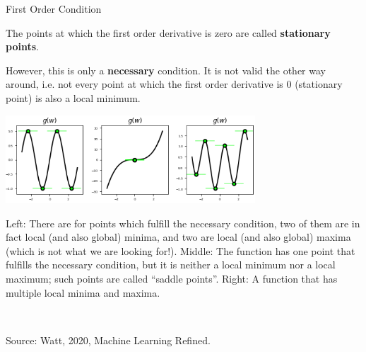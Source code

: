 \begin{vbframe}{First Order Condition}
\begin{itemize}
  \end{itemize}
  
  The points at which the first order derivative is zero are called \textbf{stationary points}. 
  
  \framebreak 
  
  However, this is only a \textbf{necessary} condition. It is not valid the other way around, i.e. not every point at which the first order derivative is $0$ (stationary point) is also a local minimum. 
  
  \begin{center}
  \includegraphics[width = 0.7\textwidth]{figure_man/saddle_points_2.png} \\
  \begin{footnotesize}
  Left: There are for points which fulfill the necessary condition, two of them are in fact local (and also global) minima, and two are local (and also global) maxima (which is not what we are looking for!). Middle: The function has one point that fulfills the necessary condition, but it is neither a local minimum nor a local maximum; such points are called \enquote{saddle points}. Right: A function that has multiple local minima and maxima. 
  \end{footnotesize}\\
  \begin{tiny}
  Source: Watt, 2020, Machine Learning Refined. 
  \end{tiny}
  \end{center}
  
  \end{vbframe}
  
